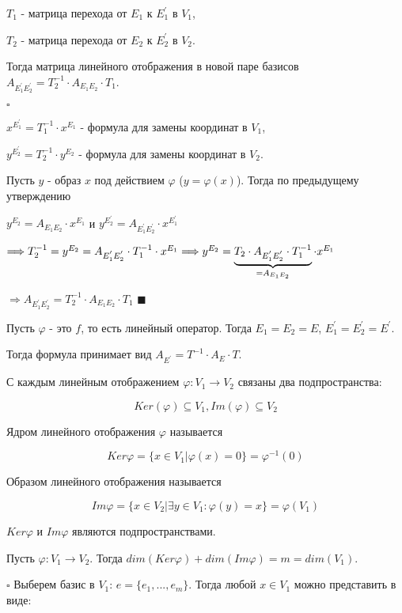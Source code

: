 \documentclass[../main.tex]{subfiles}
\begin{document}
$T_1$ - матрица перехода от $E_1$ к $E_1^{'}$ в $V_1$,

$T_2$ - матрица перехода от $E_2$ к $E_2^{'}$ в $V_2$.

Тогда матрица линейного отображения в новой паре базисов $A_{E_1^{'}E_2^{'}} = T_2^{-1}\cdot A_{E_1E_2}\cdot T_1$.

\void
$\square$

$x^{E_1^{'}} = T_1^{-1}\cdot x^{E_1}$ - формула для замены координат в $V_1$,

$y^{E_2^{'}} = T_2^{-1}\cdot y^{E_2}$ - формула для замены координат в $V_2$.

Пусть $y$ - образ $x$ под действием $\varphi$ ($y = \varphi(x)$). Тогда по предыдущему утверждению

$y^{E_2} = A_{E_1E_2}\cdot x^{E_1}$ и $y^{E_2^{'}} = A_{E_1^{'}E_2^{'}}\cdot x^{E_1^{'}}$

$\Longrightarrow T_2^{-1} = y^{E_2} = A_{E_1^{'}E_2^{'}}\cdot T_1^{-1}\cdot x^{E_1} \Longrightarrow
y^{E_2} = \underbrace{ T_2\cdot A_{E_1^{'}E_2^{'}}\cdot T_1^{-1} }_{= A_{E_1E_2}}\cdot x^{E_1}$

$\Longrightarrow A_{E_1^{'}E_2^{'}} = T_2^{-1}\cdot A_{E_1E_2}\cdot T_1$ $\blacksquare$

\void{} Пусть $\varphi$ - это $f$, то есть линейный оператор. Тогда $E_1 = E_2 = E$, $E_1^{'} = E_2^{'} = E^{'}$.

Тогда формула принимает вид $A_{E^{'}} = T^{-1}\cdot A_E\cdot T$.

\void{} С каждым линейным отображением $\varphi: V_1\rightarrow V_2$ связаны два подпространства:

$$Ker(\varphi)\subseteq V_1, Im(\varphi)\subseteq V_2$$

\void{} Ядром линейного отображения $\varphi$ называется

$$Ker\varphi = \{x\in V_1\vert \varphi(x) = 0\} = \varphi^{-1}(0)$$

\void{} Образом линейного отображения называется

$$Im\varphi = \{ x\in V_2\vert \exists y\in V_1: \varphi(y) = x \} = \varphi(V_1)$$

\void{} $Ker\varphi$ и $Im\varphi$ являются подпространствами.

\void{} Пусть $\varphi: V_1\rightarrow V_2$. Тогда $dim(Ker\varphi) + dim(Im\varphi) = m = dim(V_1)$.

\void
$\square$ Выберем базис в $V_1$: $e = \{e_1,...,e_m\}$. Тогда любой $x\in V_1$ можно представить в виде:
\end{document}
